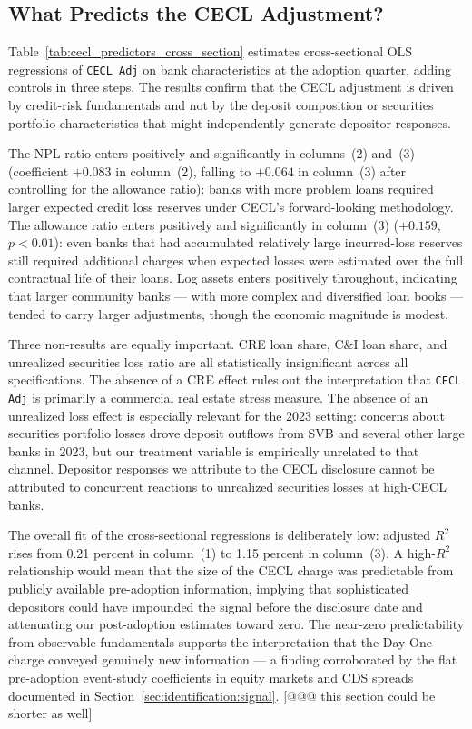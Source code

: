 \subsection{What Predicts the CECL Adjustment?}
\label{sec:descriptive:predictors}

Table~\ref{tab:cecl_predictors_cross_section} estimates cross-sectional OLS
regressions of \texttt{CECL Adj} on bank characteristics at the adoption
quarter, adding controls in three steps.  The results confirm that the CECL
adjustment is driven by credit-risk fundamentals and not by the deposit
composition or securities portfolio characteristics that might independently
generate depositor responses.

The NPL ratio enters positively and significantly in columns~(2) and~(3)
(coefficient $+0.083$ in column~(2), falling to $+0.064$ in column~(3) after
controlling for the allowance ratio): banks with more problem loans required
larger expected credit loss reserves under CECL's forward-looking methodology.
The allowance ratio enters positively and significantly in column~(3)
($+0.159$, $p < 0.01$): even banks that had accumulated relatively large
incurred-loss reserves still required additional charges when expected losses
were estimated over the full contractual life of their loans.  Log assets
enters positively throughout, indicating that larger community banks ---
with more complex and diversified loan books --- tended to carry larger
adjustments, though the economic magnitude is modest.

Three non-results are equally important.  CRE loan share, C\&I loan share, and
unrealized securities loss ratio are all statistically insignificant across all
specifications.  The absence of a CRE effect rules out the interpretation that
\texttt{CECL Adj} is primarily a commercial real estate stress measure.
The absence of an unrealized loss effect is especially relevant for the 2023
setting: concerns about securities portfolio losses drove deposit outflows from
SVB and several other large banks in 2023, but our treatment variable is
empirically unrelated to that channel.  Depositor responses we attribute to the
CECL disclosure cannot be attributed to concurrent reactions to unrealized
securities losses at high-CECL banks.

The overall fit of the cross-sectional regressions is deliberately low:
adjusted $R^2$ rises from 0.21 percent in column~(1) to 1.15 percent in
column~(3).  A high-$R^2$ relationship would mean that the size of the CECL
charge was predictable from publicly available pre-adoption information,
implying that sophisticated depositors could have impounded the signal before
the disclosure date and attenuating our post-adoption estimates toward zero.
The near-zero predictability from observable fundamentals supports the
interpretation that the Day-One charge conveyed genuinely new information ---
a finding corroborated by the flat pre-adoption event-study coefficients in
equity markets and CDS spreads documented in
Section~\ref{sec:identification:signal}. [@@@ this section could be shorter as well]
